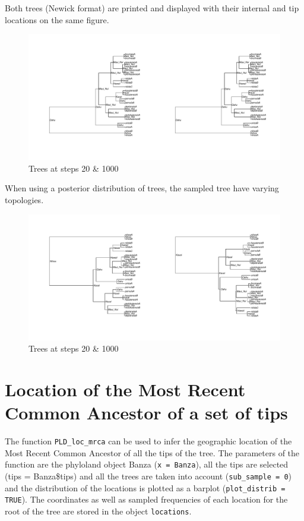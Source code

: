 \documentclass[a4paper]{article}
\begin{document}
\indent Both trees (Newick format) are printed and displayed with their internal and tip locations on the same figure.\\
\begin{figure}[h!]
\begin{center}
\includegraphics[width=.9\textwidth]{figures/tree_20_1000_Banza.pdf}
\caption{Trees at steps 20 \& 1000}
\end{center}
\end{figure}

\indent When using a posterior distribution of trees, the sampled tree have varying topologies.\\
\begin{figure}[h!]
\begin{center}
\includegraphics[width=.9\textwidth]{figures/tree_20_1000_Banzap.pdf}
\caption{Trees at steps 20 \& 1000}
\end{center}
\end{figure}

\setlength\abovecaptionskip{0pt}
\newpage
\section{Location of the Most Recent Common Ancestor of a set of tips}
\hspace{12pt} The function \texttt{PLD\_loc\_mrca} can be used to infer the geographic location of the Most Recent Common Ancestor of all the tips of the tree.
The parameters of the function are the phyloland object Banza (\texttt{x = Banza}), all the tips are selected (tips = Banza\$tips) and all the trees are taken into account (\texttt{sub\_sample = 0}) and the distribution of the locations is plotted as a barplot (\texttt{plot\_distrib = TRUE}).
The coordinates as well as sampled frequencies of each location for the root of the tree are stored in the object \texttt{locations}.
\end{document}
